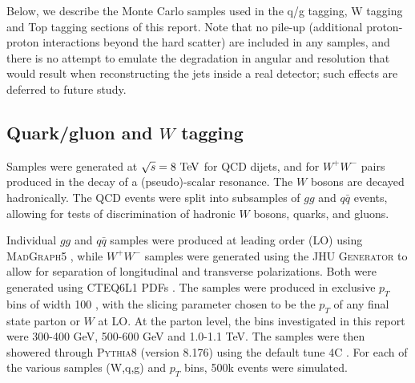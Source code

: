 Below, we describe the Monte Carlo samples used in the q/g tagging,
W tagging and Top tagging sections of this report. Note
that no pile-up (additional proton-proton
interactions beyond the hard scatter) are included in any samples, and there is no
attempt to emulate the degradation in angular and \pt resolution that
would result when reconstructing the jets inside a real detector; such effects are deferred to 
future study.


\subsection{Quark/gluon and $W$ tagging}

Samples were generated at $\sqrt{s} = 8\TeV$ for QCD dijets, and for $W^+W^-$
pairs produced in the decay of a (pseudo)-scalar resonance. The $W$ bosons are decayed
hadronically. The QCD events
were split into subsamples of $gg$ and $q\bar{q}$ events, allowing for tests of
discrimination of hadronic $W$ bosons, quarks, and gluons.

Individual $gg$ and $q\bar{q}$ samples were produced at leading order (LO)
using \textsc{MadGraph5} \cite{Alwall:2011uj}, while $W^+W^-$ samples were generated using
the \textsc{JHU Generator} \cite{Gao:2010qx,Bolognesi:2012mm,Anderson:2013afp} to allow for separation of longitudinal and
transverse polarizations. Both were generated using \textsc{CTEQ6L1}
PDFs \cite{Pumplin:2002vw}. The samples were produced in exclusive $p_T$ bins
of width 100 {\GeV}, with the slicing parameter
chosen to be the $p_T$ of any final state parton or $W$ at LO. At the
parton level, the \pt bins investigated in this report were 300-400 GeV, 500-600 GeV
and 1.0-1.1 TeV. 
The samples were
then showered through \textsc{Pythia8} (version 8.176) \cite{Sjostrand:2007gs} using the default tune 4C \cite{Buckley:2011ms}.
For each of the various samples (W,q,g) and $p_T$ bins, 500k events were simulated.





